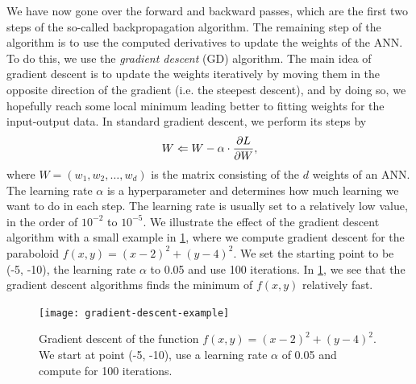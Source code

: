 We have now gone over the forward and backward passes, which are the first two steps of the so-called backpropagation algorithm. The remaining step of the algorithm is to use the computed derivatives to update the weights of the ANN. To do this, we use the \textit{gradient descent} (GD) algorithm. The main idea of gradient descent is to update the weights iteratively by moving them in the opposite direction of the gradient (i.e. the steepest descent), and by doing so, we hopefully reach some local minimum leading better to fitting weights for the input-output data. In standard gradient descent, we perform its steps by
\begin{align}
    W \Leftarrow W - \alpha \cdot \frac{\partial L}{\partial W},
\end{align}
where $W = \left( w_1, w_2, \ldots, w_d \right)$ is the matrix consisting of the $d$ weights of an ANN. The learning rate $\alpha$ is a hyperparameter and determines how much learning we want to do in each step. The learning rate is usually set to a relatively low value, in the order of $10^{-2}$ to $10^{-5}$. We illustrate the effect of the gradient descent algorithm with a small example in \cref{fig:gradient-descent-example}, where we compute gradient descent for the paraboloid $f(x, y) = (x - 2)^2 + (y - 4)^2$. We set the starting point to be (-5, -10), the learning rate $\alpha$ to 0.05 and use 100 iterations. In \cref{fig:gradient-descent-example}, we see that the gradient descent algorithms finds the minimum of $f(x, y)$ relatively fast.
\begin{figure}[H]
    \centering
    \texttt{[image: gradient-descent-example]}
    \caption{Gradient descent of the function $f(x, y) = (x - 2)^2 + (y - 4)^2$. We start at point (-5, -10), use a learning rate $\alpha$ of 0.05 and compute for 100 iterations.}
    \label{fig:gradient-descent-example}
\end{figure}

